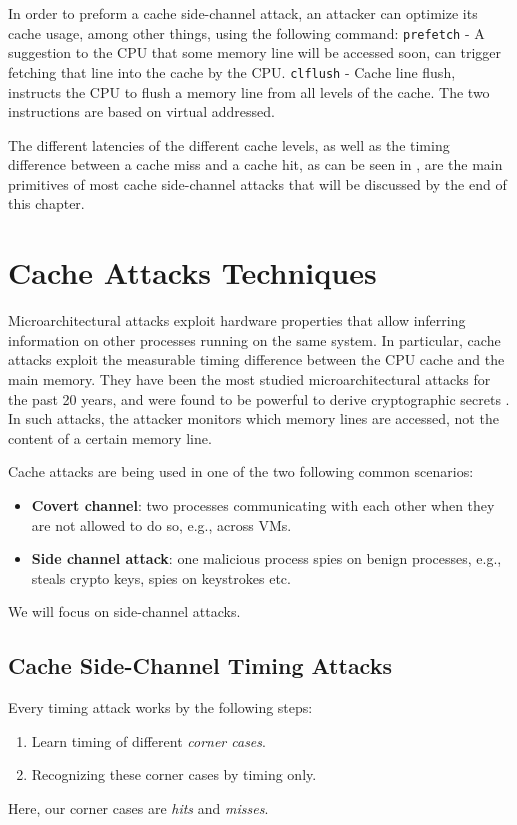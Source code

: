 In order to preform a cache side-channel attack, an attacker can optimize its cache usage, among other things, using the following command: \texttt{prefetch} - A suggestion to the CPU that some memory line will be accessed soon, can trigger fetching that line into the cache by the CPU. \texttt{clflush} - Cache line flush, instructs the CPU to flush a memory line from all levels of the cache. The two instructions are based on virtual addressed.

The different latencies of the different cache levels, as well as the timing difference between a cache miss and a cache hit, as can be seen in , are the main primitives of most cache side-channel attacks that will be discussed by the end of this chapter.  

\section{Cache Attacks Techniques} %
\label{sec:cacheattackstech}

Microarchitectural attacks exploit hardware properties that allow inferring information on other processes running on the same system.
In particular, cache attacks exploit the measurable timing difference between the CPU cache and the main memory. They have been the most studied microarchitectural attacks for the past 20 years, and were found to be powerful to derive cryptographic secrets \cite{Percival2009}. In such attacks, the attacker monitors which memory lines are accessed, not the content of a certain memory line.

\noindent Cache attacks are being used in one of the two following common scenarios:
\begin{itemize}
\item \textbf{Covert channel}: two processes communicating with each other when they are not allowed to do so, e.g., across VMs.
\item \textbf{Side channel attack}: one malicious process spies on benign processes, e.g., steals crypto keys, spies on keystrokes etc. 
\end{itemize}
We will focus on side-channel attacks.

\subsection{Cache Side-Channel Timing Attacks}
\label{subsec:cachesidechanneltiming}
Every timing attack works by the following steps:
\begin{enumerate}
    \item Learn timing of different \textit{corner cases}.
    \item Recognizing these corner cases by timing only.
\end{enumerate}
Here, our corner cases are \textit{hits} and \textit{misses}.

